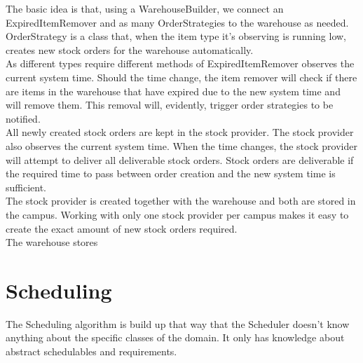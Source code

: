 \documentclass[12pt]{article}
\begin{document}
The basic idea is that, using a WarehouseBuilder, we connect an ExpiredItemRemover and as many OrderStrategies to the warehouse as needed.\\ OrderStrategy is a class that, when the item type it's observing is running low, creates new stock orders for the warehouse automatically.\\
As different types require different methods of 
ExpiredItemRemover observes the current system time. Should the time change, the item remover will check if there are items in the warehouse that have expired due to the new system time and will remove them. This removal will, evidently, trigger order strategies to be notified.\\
All newly created stock orders are kept in the stock provider. The stock provider also observes the current system time. When the time changes, the stock provider will attempt to deliver all deliverable stock orders. Stock orders are deliverable if the required time to pass between order creation and the new system time is sufficient.\\
The stock provider is created together with the warehouse and both are stored in the campus. Working with only one stock provider per campus makes it easy to create the exact amount of new stock orders required.\\
The warehouse stores 

\section{Scheduling}
The Scheduling algorithm is build up that way that the Scheduler doesn't know anything about the specific classes of the domain. It only has knowledge about abstract schedulables and requirements.
\end{document}
